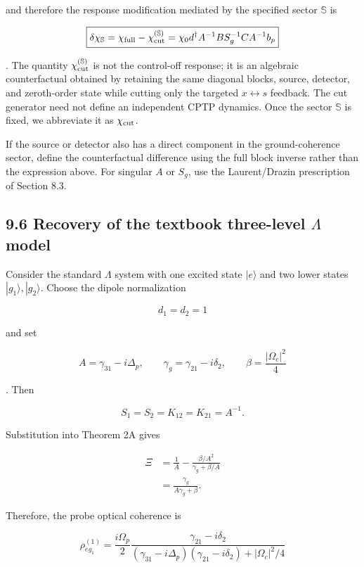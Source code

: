 \documentclass[
  10pt,
  a4paper,
]{article}
\begin{document}
and therefore the response modification mediated by the specified sector
\(\mathbb S\) is

\[
\boxed{
\delta\chi_{\mathbb S}
=\chi_{\rm full}-\chi_{\rm cut}^{(\mathbb S)}
=\chi_0d^\dagger A^{-1}B
S_g^{-1}CA^{-1}b_p
}
\]

. The quantity \(\chi_{\rm cut}^{(\mathbb S)}\) is not the control-off
response; it is an algebraic counterfactual obtained by retaining the
same diagonal blocks, source, detector, and zeroth-order state while
cutting only the targeted \(x\leftrightarrow s\) feedback. The cut
generator need not define an independent CPTP dynamics. Once the sector
\(\mathbb S\) is fixed, we abbreviate it as \(\chi_{\rm cut}\).

If the source or detector also has a direct component in the
ground-coherence sector, define the counterfactual difference using the
full block inverse rather than the expression above. For singular \(A\)
or \(S_g\), use the Laurent/Drazin prescription of Section 8.3.

\subsection{\texorpdfstring{9.6 Recovery of the textbook three-level
\(\Lambda\)
model}{9.6 Recovery of the textbook three-level \textbackslash Lambda model}}\label{recovery-of-the-textbook-three-level-lambda-model}

Consider the standard \(\Lambda\) system with one excited state
\(|e\rangle\) and two lower states \(|g_1\rangle,|g_2\rangle\). Choose
the dipole normalization

\[
d_1=d_2=1
\]

and set

\[
A=\gamma_{31}-i\Delta_p,
\qquad
\gamma_g=\gamma_{21}-i\delta_2,
\qquad
\beta=\frac{|\Omega_c|^2}{4}
\]

. Then

\[
S_1=S_2=K_{12}=K_{21}=A^{-1}.
\]

Substitution into Theorem 2A gives

\[
\begin{aligned}
\Xi
&=\frac1A-
\frac{\beta/A^2}{\gamma_g+\beta/A}\\
&=\boxed{
\frac{\gamma_g}{A\gamma_g+\beta}
}.
\end{aligned}
\]

Therefore, the probe optical coherence is

\[
\boxed{
\rho_{eg_1}^{(1)}
=\frac{i\Omega_p}{2}
\frac{\gamma_{21}-i\delta_2}
{(\gamma_{31}-i\Delta_p)(\gamma_{21}-i\delta_2)+|\Omega_c|^2/4}
}
\]
\end{document}
